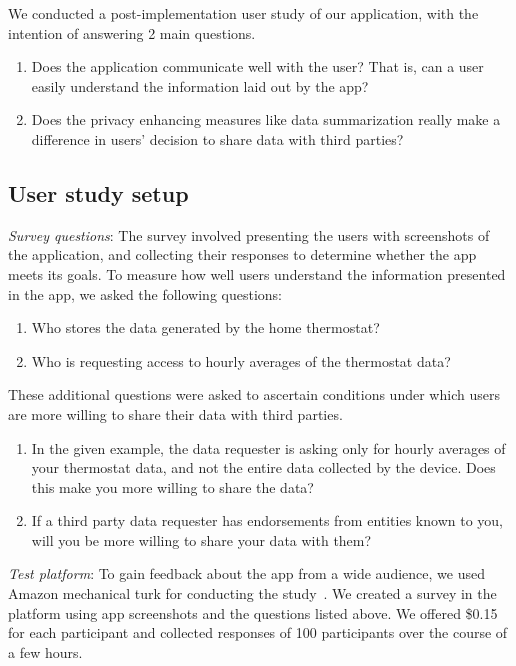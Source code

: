 We conducted a post-implementation user study of our application, with the intention of answering 2 main questions.
\begin{enumerate}
	\item Does the application communicate well with the user? That is, can a user easily understand the information laid out by the app?
	\item Does the privacy enhancing measures like data summarization really make a difference in users' decision to share data with third parties?
\end{enumerate}

\subsection{User study setup}

\textit{Survey questions}: The survey involved presenting the users with screenshots of the application, and collecting their responses to determine whether the app meets its goals. To measure how well users understand the information presented in the app, we asked the following questions:
\begin{enumerate}
	\item Who stores the data generated by the home thermostat?
	\item Who is requesting access to hourly averages of the thermostat data?
\end{enumerate}

These additional questions were asked to ascertain conditions under which users are more willing to share their data with third parties.
\begin{enumerate}
	\item In the given example, the data requester is asking only for hourly averages of your thermostat data, and not the entire data collected by the device. Does this make you more willing to share the data?
	\item If a third party data requester has endorsements from entities known to you, will you be more willing to share your data with them?
\end{enumerate}

\textit{Test platform}: To gain feedback about the app from a wide audience, we used Amazon mechanical turk for conducting the study~\cite{mturk}. We created a survey in the platform using app screenshots and the questions listed above. We offered \$0.15 for each participant and collected responses of 100 participants over the course of a few hours.

